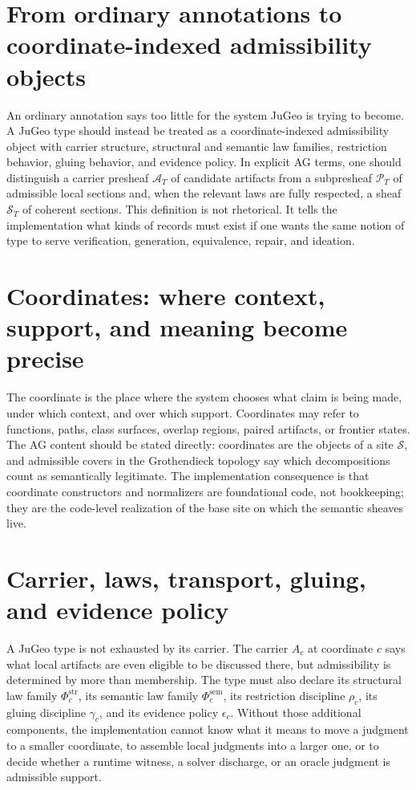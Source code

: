 \documentclass[11pt]{report}
\begin{document}
\section{From ordinary annotations to coordinate-indexed admissibility objects}
An ordinary annotation says too little for the system JuGeo is trying to become. A JuGeo type should instead be treated as a coordinate-indexed admissibility object with carrier structure, structural and semantic law families, restriction behavior, gluing behavior, and evidence policy. In explicit AG terms, one should distinguish a carrier presheaf $\mathscr{A}_T$ of candidate artifacts from a subpresheaf $\mathscr{P}_T$ of admissible local sections and, when the relevant laws are fully respected, a sheaf $\mathscr{S}_T$ of coherent sections. This definition is not rhetorical. It tells the implementation what kinds of records must exist if one wants the same notion of type to serve verification, generation, equivalence, repair, and ideation.

\section{Coordinates: where context, support, and meaning become precise}
The coordinate is the place where the system chooses what claim is being made, under which context, and over which support. Coordinates may refer to functions, paths, class surfaces, overlap regions, paired artifacts, or frontier states. The AG content should be stated directly: coordinates are the objects of a site $\mathcal{S}$, and admissible covers in the Grothendieck topology say which decompositions count as semantically legitimate. The implementation consequence is that coordinate constructors and normalizers are foundational code, not bookkeeping; they are the code-level realization of the base site on which the semantic sheaves live.

\section{Carrier, laws, transport, gluing, and evidence policy}
A JuGeo type is not exhausted by its carrier. The carrier $A_c$ at coordinate $c$ says what local artifacts are even eligible to be discussed there, but admissibility is determined by more than membership. The type must also declare its structural law family $\Phi^{\mathrm{str}}_c$, its semantic law family $\Phi^{\mathrm{sem}}_c$, its restriction discipline $\rho_c$, its gluing discipline $\gamma_c$, and its evidence policy $\epsilon_c$. Without those additional components, the implementation cannot know what it means to move a judgment to a smaller coordinate, to assemble local judgments into a larger one, or to decide whether a runtime witness, a solver discharge, or an oracle judgment is admissible support.
\end{document}
